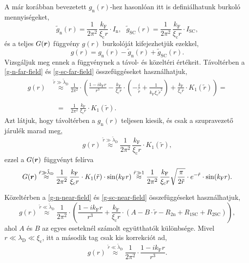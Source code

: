 \documentclass[a4paper,12pt,titlepage]{article}
\newcommand{\RR}{{\vb*{r}}}
\newcommand{\kF}{{k_\text{F}}}
\begin{document}
A már korábban bevezetett $g_\text{n}(r)$-hez hasonlóan itt is definiálhatunk burkoló mennyiségeket,
\begin{equation}
	\tilde{g}_\text{n}(r) = \frac{1}{2 \pi^2} \, \frac{\kF}{\xi_\text{c} r} \cdot I_\text{n}, ~~~
	\tilde{g}_\text{SC}(r) = \frac{1}{2 \pi^2} \, \frac{\kF}{\xi_\text{c} r} \cdot I_\text{SC},
\end{equation}
és a teljes $G(\RR)$ függvény $g(r)$ burkolóját kifejezhetjük ezekkel,
\begin{equation}
	g(r) = g_\text{n}(r) - \tilde{g}_\text{n}(r) + \tilde{g}_\text{SC}(r).
\end{equation}
Vizsgáljuk meg ennek a függvénynek a távol- és közeltéri értékeit.  Távoltérben a \eqref{g-n-far-field} és \eqref{g-sc-far-field} összefüggéseket használhatjuk,
\begin{equation}
\begin{split}
	g(r) & \stackrel{\tilde{r} \gg \tilde{\lambda}_\text{D}}{\approx} \frac{1}{2 \pi^2} \cdot \left( \frac{1 - i \kF r}{r^3} - \frac{\kF}{\xi_\text{c} r} \cdot \left( -\frac{i}{\tilde{r}} + \frac{1}{\kF \xi_\text{c} \tilde{r}^2} \right) + \frac{\kF}{\xi_\text{c} r} \cdot K_1(\tilde{r}) \right) = \\
	& \stackrel{\phantom{\tilde{r} \gg \tilde{\lambda}_\text{D}}}{=} \frac{1}{2 \pi^2} \, \frac{\kF}{\xi_\text{c} r} \cdot K_1(\tilde{r}).
\end{split}
\end{equation}
Azt látjuk, hogy távoltérben a $g_\text{n}(r)$ teljesen kiesik, és csak a szupravezető járulék marad meg,
\begin{equation}
	g(r) \stackrel{\tilde{r} \gg \tilde{\lambda}_\text{D}}{\approx} \frac{1}{2 \pi^2} \, \frac{\kF}{\xi_\text{c} r} \cdot K_1(\tilde{r}),
\end{equation}
ezzel a $G(\RR)$ függvényt felírva
\begin{equation}
	G(\RR) \stackrel{\tilde{r} \gg \tilde{\lambda}_\text{D}}{\approx} \frac{1}{2 \pi^2} \, \frac{\kF}{\xi_\text{c} r} \cdot K_1(\tilde{r}) \cdot \sin(\kF r) \stackrel{\tilde{r} \gg 1}{\approx} \frac{1}{2 \pi^2} \, \frac{\kF}{\xi_\text{c} r} \sqrt{\frac{\pi}{2 \tilde{r}}} \cdot e^{-\tilde{r}} \cdot \sin(\kF r).
\end{equation}

Közeltérben a \eqref{g-n-near-field} és \eqref{g-sc-near-field} összefüggéseket használhatjuk,
\begin{equation}
	g(r) \stackrel{\tilde{r} \ll \tilde{\lambda}_\text{D}}{\approx} \frac{1}{2 \pi^2} \cdot \left( \frac{1 - i \kF r}{r^3} + \frac{\kF}{\xi_\text{c} r} \cdot \left( A - B \cdot \tilde{r} - R_{2 \text{n}} + R_{1 \text{SC}} + R_{2 \text{SC}} \right) \right),
\end{equation}
ahol $A$ és $B$ az egyes eseteknél számolt együtthatók különbsége.  Mivel $r \ll \lambda_\text{D} \ll \xi_\text{c}$, itt a második tag csak kis korrekciót ad,
\begin{equation}
	g(r) \stackrel{\tilde{r} \ll \tilde{\lambda}_\text{D}}{\approx} \frac{1}{2 \pi^2} \cdot \frac{1 - i \kF r}{r^3}.
\end{equation}
\end{document}
